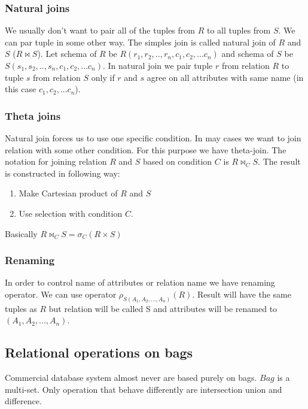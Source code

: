 \subsubsection{Natural joins}
We usually don't want to pair all of the tuples from $R$ to all tuples from $S$. We can par tuple in some other way. The simples join is called natural join of $R$ and $S$ ($R \Join S$). Let schema of $R$ be $R(r_1,r_2,..,r_n,c_1,c_2,...c_n)$ and schema of $S$ be  $S(s_1,s_2,..,s_n,c_1,c_2,...c_n)$. In natural join we pair tuple $r$ from relation $R$ to tuple $s$ from relation $S$ only if $r$ and $s$ agree on all attributes with same name (in this case $c_1,c_2,...c_n$).

\subsubsection{Theta joins}
Natural join forces us to use one specific condition. In may cases we want to join relation with some other condition. For this purpose we have theta-join. The notation for joining relation $R$ and $S$ based on condition $C$ is $R\Join_C S$. The result is constructed in following way:

\begin{enumerate}
\item Make Cartesian product of $R$ and $S$
\item Use selection with condition $C$.
\end{enumerate}

Basically $R\Join_C S=\sigma_C(R \times S)$

\subsubsection{Renaming}

In order to control name of attributes or relation name we have renaming operator. We can use operator $\rho_{S(A_1,A_2,...,A_n)}(R)$. Result will have the same tuples as $R$ but relation will be called S and attributes will be renamed to $(A_1,A_2,...,A_n)$.

\subsection{Relational operations on bags}

Commercial database system almost never are based purely on bags. $Bag$ is a multi-set. Only operation that behave differently are intersection union and difference. 

